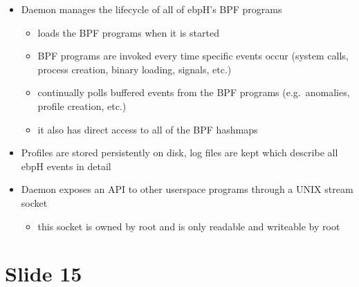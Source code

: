 \documentclass[
  12pt]{findlay}
\providecommand{\tightlist}{\setlength{\itemsep}{0pt}\setlength{\parskip}{0pt}}
\begin{document}
\begin{itemize}
\tightlist
\item
  Daemon manages the lifecycle of all of ebpH's BPF programs

  \begin{itemize}
  \tightlist
  \item
    loads the BPF programs when it is started
  \item
    BPF programs are invoked every time specific events occur (system
    calls, process creation, binary loading, signals, etc.)
  \item
    continually polls buffered events from the BPF programs
    (e.g.~anomalies, profile creation, etc.)
  \item
    it also has direct access to all of the BPF hashmaps
  \end{itemize}
\item
  Profiles are stored persistently on disk, log files are kept which
  describe all ebpH events in detail
\item
  Daemon exposes an API to other userspace programs through a UNIX
  stream socket

  \begin{itemize}
  \tightlist
  \item
    this socket is owned by root and is only readable and writeable by
    root
  \end{itemize}
\end{itemize}

\hypertarget{slide-15}{%
\section{Slide 15}\label{slide-15}}
\end{document}
